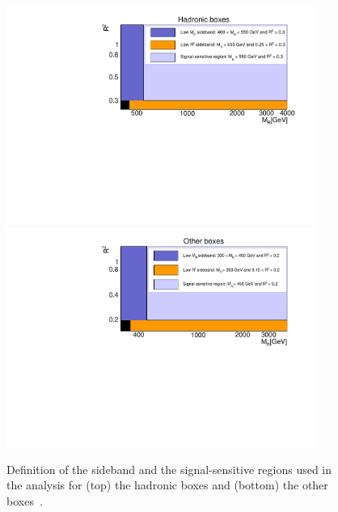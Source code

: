 \begin{figure}[ht!]
\centering
\includegraphics[width=0.9\textwidth]{figs/analysis8TeV/SidebandL_MultiJet.pdf}\\
\includegraphics[width=0.9\textwidth]{figs/analysis8TeV/SidebandL_Mu.pdf}
\caption{\label{fig:regions} Definition of the sideband and the
 signal-sensitive regions used in the analysis for (top) the hadronic
 boxes and (bottom) the other boxes~\cite{razor8TeV,jmgd}.}
\end{figure}

